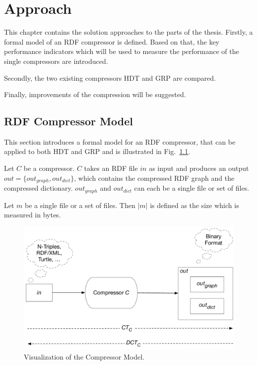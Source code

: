 \chapter{Approach}\label{ch:approach}

This chapter contains the solution approaches to the parts of the thesis. Firstly, a formal model of an RDF compressor is defined. Based on that, the key performance indicators which will be used to measure the performance of the single compressors are introduced.

Secondly, the two existing compressors HDT and GRP are compared.

Finally, improvements of the compression will be suggested.

\section{RDF Compressor Model}\label{sec:compressorModel}

This section introduces a formal model for an RDF compressor, that can be applied to both HDT and GRP and is illustrated in Fig.~\ref{fig:compressorModel}.

Let $C $ be a compressor. $C$ takes an RDF file $in$ as input and produces an output $out=\{out_{graph}, out_{dict}\}$, which contains the compressed RDF graph and the compressed dictionary. $out_{graph}$ and $out_{dict}$ can each be a single file or set of files. 

Let $m$ be a single file or a set of files. Then $|m|$ is defined as the size which is measured in bytes.

\begin{figure}
	\centering
	\includegraphics[width=0.9\linewidth]{figures/approach/model}
	\caption{Visualization of the Compressor Model.}
	\label{fig:compressorModel}
\end{figure}


